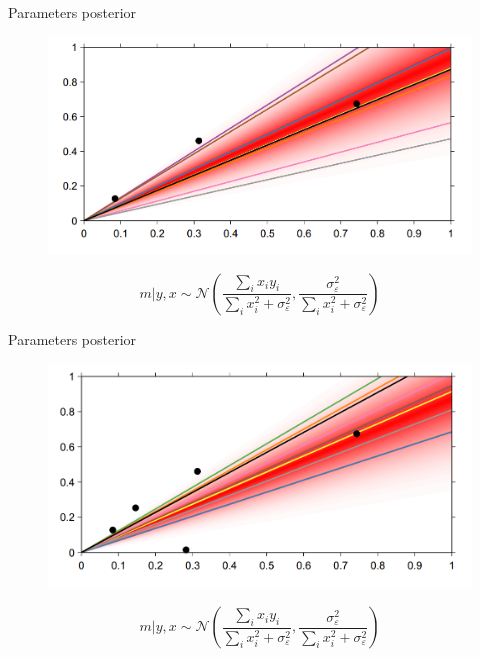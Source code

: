 \documentclass[12pt]{beamer}
\begin{document}
\begin{frame}{Parameters posterior}
\begin{figure}
\includegraphics[scale=0.4]{Bayesian_3.png} 
\end{figure}
$$m|y,x \sim \mathcal{N}\left(\frac{\sum_i x_i y_i}{\sum_i x_i^2 + \sigma_{\varepsilon}^2},\frac{\sigma_{\varepsilon}^2}{\sum_i x_i^2 + \sigma_{\varepsilon}^2}\right)$$
\end{frame}

\begin{frame}{Parameters posterior}
\begin{figure}
\includegraphics[scale=0.4]{Bayesian_4.png} 
\end{figure}
$$m|y,x \sim \mathcal{N}\left(\frac{\sum_i x_i y_i}{\sum_i x_i^2 + \sigma_{\varepsilon}^2},\frac{\sigma_{\varepsilon}^2}{\sum_i x_i^2 + \sigma_{\varepsilon}^2}\right)$$
\end{frame}
\end{document}
